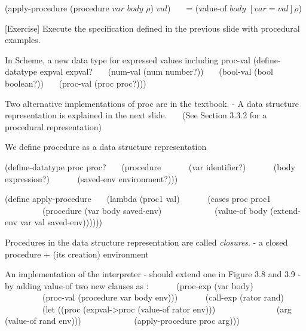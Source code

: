 \documentclass{article}
\begin{document}
\begin{huge}
(apply-procedure (procedure $var$ $body$ $\rho$) $val$) \al
\ \ \ = (value-of $body$ $[var=val]\rho$)


[Exercise] Execute the specification defined in the previous slide 
with procedural examples.


In Scheme, a new data type for expressed values including proc-val \al
(define-datatype expval expval? \al
\ \ \ (num-val (num number?)) \al
\ \ \ (bool-val (bool boolean?)) \al
\ \ \ (proc-val (proc proc?)))

Two alternative implementations of proc are in the textbook. \al
- A data structure representation is explained in the next slide. \al
\ \ \ (See Section 3.3.2 for a procedural representation)


We define procedure as a data structure representation

(define-datatype proc proc? \al
\ \ \ (procedure \al
\ \ \ \ \ \ (var identifier?) \al
\ \ \ \ \ \ (body expression?) \al
\ \ \ \ \ \ (saved-env environment?)))

(define apply-procedure \al
\ \ \ (lambda (proc1 val) \al
\ \ \ \ \ \ (cases proc proc1 \al
\ \ \ \ \ \ \ \ \ (procedure (var body saved-env) \al
\ \ \ \ \ \ \ \ \ \ \ \ (value-of body (extend-env var val saved-env))))))

Procedures in the data structure  representation are called {\it closures}. \al
- a closed procedure + (its creation) environment


An implementation of the interpreter \al
- should extend one in Figure 3.8 and 3.9 \al
- by adding value-of two new clauses as : \al
\al
\ \ \ \ \ \ (proc-exp (var body)  \al
\ \ \ \ \ \ \ \ \ (proc-val (procedure var body env))) \al
\al
\ \ \ \ \ \ (call-exp (rator rand) \al
\ \ \ \ \ \ \ \ \ (let ((proc (expval-\textgreater proc (value-of rator env))) \al
\ \ \ \ \ \ \ \ \ \ \ \ \ \ (arg (value-of rand env))) \al
\ \ \ \ \ \ \ \ \ \ \ \ (apply-procedure proc arg)))


\end{huge}
\end{document}

